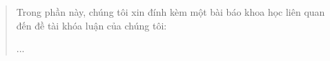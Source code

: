 \label{phux1ee5-lux1ee5c-a.}

\begin{quote}
Trong phần này, chúng tôi xin đính kèm một bài báo khoa học liên quan đến đề tài khóa luận của chúng tôi:

...
\end{quote}

